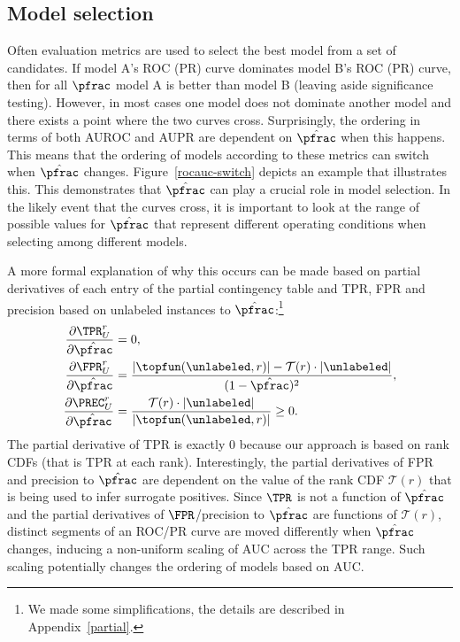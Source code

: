
\subsection{Model selection}
Often evaluation metrics are used to select the best model from a set of candidates. If model A's ROC (PR) curve dominates model B's ROC (PR) curve, then for all $\pfrac$ model A is better than model B (leaving aside significance testing). However, in most cases one model does not dominate another model and there exists a point where the two curves cross. Surprisingly, the ordering in terms of both AUROC and AUPR are dependent on $\hat{\pfrac}$ when this happens. This means that the ordering of models according to these metrics can switch when $\hat{\pfrac}$ changes. Figure~\ref{rocauc-switch} depicts an example that illustrates this. This demonstrates that $\hat{\pfrac}$ can play a crucial role in model selection. In the likely event that the curves cross, it is important to look at the range of possible values for $\hat{\pfrac}$ that represent different operating conditions when selecting among different models.



A more formal explanation of why this occurs can be made based on partial derivatives of each entry of the partial contingency table and TPR, FPR and precision based on unlabeled instances to $\hat{\pfrac}$:\footnote{We made some simplifications, the details are described in Appendix~\ref*{partial}.}
\begin{align}
\frac{\partial \TPR_U^r}{\partial \hat{\pfrac}} &= 0,\\
\frac{\partial \FPR_U^r}{\partial \hat{\pfrac}} &= \frac{|\topfun(\unlabeled, r)| - \mathcal{T}(r) \cdot |\unlabeled|}{(1-\hat{\pfrac})^2}, \label{eq:partials} \\
\frac{\partial \PREC_U^r}{\partial \hat{\pfrac}} &= \frac{\mathcal{T}(r)\cdot|\unlabeled|}{|\topfun(\unlabeled,r)|} \geq 0.
\end{align}
The partial derivative of TPR is exactly 0 because our approach is based on rank CDFs (that is TPR at each rank). Interestingly, the partial derivatives of FPR and precision to $\hat{\pfrac}$ are dependent on the value of the rank CDF $\mathcal{T}(r)$ that is being used to infer surrogate positives. Since $\TPR$ is not a function of $\hat{\pfrac}$ and the partial derivatives of $\FPR$/precision to $\hat{\pfrac}$ are functions of $\mathcal{T}(r)$, distinct segments of an ROC/PR curve are moved differently when $\hat{\pfrac}$ changes, inducing a non-uniform scaling of AUC across the TPR range. Such scaling potentially changes the ordering of models based on AUC. 

